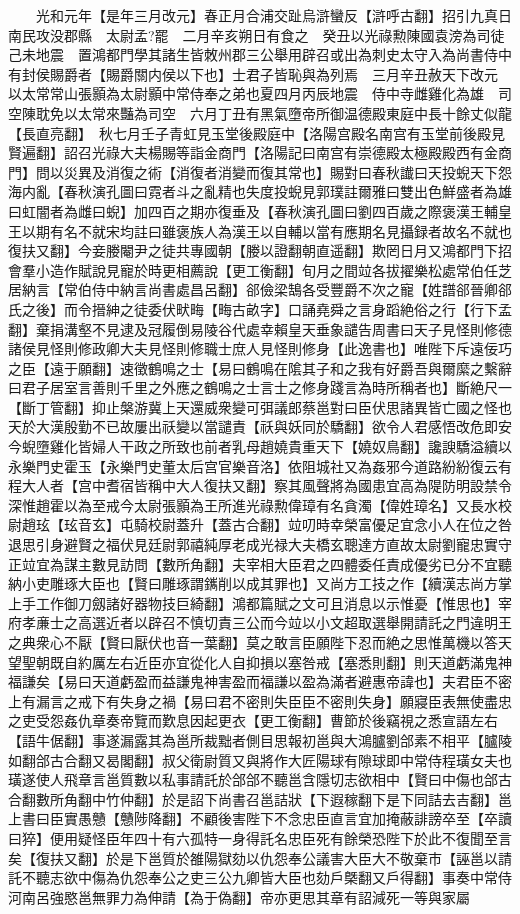 　　光和元年【是年三月改元】春正月合浦交趾烏滸蠻反【滸呼古翻】招引九真日南民攻没郡縣　太尉孟?罷　二月辛亥朔日有食之　癸丑以光祿勲陳國袁滂為司徒　己未地震　置鴻都門學其諸生皆敇州郡三公舉用辟召或出為刺史太守入為尚書侍中有封侯賜爵者【賜爵關内侯以下也】士君子皆恥與為列焉　三月辛丑赦天下改元　以太常常山張顥為太尉顥中常侍奉之弟也夏四月丙辰地震　侍中寺雌雞化為雄　司空陳耽免以太常來豔為司空　六月丁丑有黑氣墮帝所御温德殿東庭中長十餘丈似龍【長直亮翻】　秋七月壬子青虹見玉堂後殿庭中【洛陽宫殿名南宫有玉堂前後殿見賢遍翻】詔召光祿大夫楊賜等詣金商門【洛陽記曰南宫有崇德殿太極殿殿西有金商門】問以災異及消復之術【消復者消變而復其常也】賜對曰春秋䜟曰天投蜺天下怨海内亂【春秋演孔圖曰霓者斗之亂精也失度投蜺見郭璞註爾雅曰雙出色鮮盛者為雄曰虹闇者為雌曰蜺】加四百之期亦復垂及【春秋演孔圖曰劉四百歲之際褒漢王輔皇王以期有名不就宋均註曰雖褒族人為漢王以自輔以當有應期名見攝録者故名不就也復扶又翻】今妾媵閹尹之徒共專國朝【媵以證翻朝直遥翻】欺罔日月又鴻都門下招會羣小造作賦說見寵於時更相薦說【更工衡翻】旬月之間竝各拔擢樂松處常伯任芝居納言【常伯侍中納言尚書處昌呂翻】郤儉梁鵠各受豐爵不次之寵【姓譜郤晉卿郤氏之後】而令搢紳之徒委伏畎畮【畮古畝字】口誦堯舜之言身蹈絶俗之行【行下孟翻】棄捐溝壑不見逮及冠履倒易陵谷代處幸賴皇天垂象譴告周書曰天子見怪則修德諸侯見怪則修政卿大夫見怪則修職士庶人見怪則修身【此逸書也】唯陛下斥遠佞巧之臣【遠于願翻】速徵鶴鳴之士【易曰鶴鳴在隂其子和之我有好爵吾與爾縻之繫辭曰君子居室言善則千里之外應之鶴鳴之士言士之修身踐言為時所稱者也】斷絶尺一【斷丁管翻】抑止槃游冀上天還威衆變可弭議郎蔡邕對曰臣伏思諸異皆亡國之怪也天於大漢殷勤不已故屢出祅變以當譴責【祅與妖同於驕翻】欲令人君感悟改危即安今蜺墮雞化皆婦人干政之所致也前者乳母趙嬈貴重天下【嬈奴鳥翻】讒諛驕溢續以永樂門史霍玉【永樂門史董太后宫官樂音洛】依阻城社又為姦邪今道路紛紛復云有程大人者【宫中耆宿皆稱中大人復扶又翻】察其風聲將為國患宜高為隄防明設禁令深惟趙霍以為至戒今太尉張顥為王所進光祿勲偉璋有名貪濁【偉姓璋名】又長水校尉趙玹【玹音玄】屯騎校尉蓋升【蓋古合翻】竝叨時幸榮富優足宜念小人在位之咎退思引身避賢之福伏見廷尉郭禧純厚老成光禄大夫橋玄聰達方直故太尉劉寵忠實守正竝宜為謀主數見訪問【數所角翻】夫宰相大臣君之四體委任責成優劣已分不宜聽納小吏雕琢大臣也【賢曰雕琢謂䥴削以成其罪也】又尚方工技之作【續漢志尚方掌上手工作御刀劔諸好器物技巨綺翻】鴻都篇賦之文可且消息以示惟憂【惟思也】宰府孝亷士之高選近者以辟召不慎切責三公而今竝以小文超取選舉開請託之門違明王之典衆心不厭【賢曰厭伏也音一葉翻】莫之敢言臣願陛下忍而絶之思惟萬機以答天望聖朝既自約厲左右近臣亦宜從化人自抑損以塞咎戒【塞悉則翻】則天道虧滿鬼神福謙矣【易曰天道虧盈而益謙鬼神害盈而福謙以盈為滿者避惠帝諱也】夫君臣不密上有漏言之戒下有失身之禍【易曰君不密則失臣臣不密則失身】願寢臣表無使盡忠之吏受怨姦仇章奏帝覽而歎息因起更衣【更工衡翻】曹節於後竊視之悉宣語左右【語牛倨翻】事遂漏露其為邕所裁黜者側目思報初邕與大鴻臚劉郃素不相平【臚陵如翻郃古合翻又曷閣翻】叔父衛尉質又與將作大匠陽球有隙球即中常侍程璜女夫也璜遂使人飛章言邕質數以私事請託於郃郃不聽邕含隱切志欲相中【賢曰中傷也郃古合翻數所角翻中竹仲翻】於是詔下尚書召邕詰狀【下遐稼翻下是下同詰去吉翻】邕上書曰臣實愚戇【戇陟降翻】不顧後害陛下不念忠臣直言宜加掩蔽誹謗卒至【卒讀曰猝】便用疑怪臣年四十有六孤特一身得託名忠臣死有餘榮恐陛下於此不復聞至言矣【復扶又翻】於是下邕質於雒陽獄劾以仇怨奉公議害大臣大不敬棄市【誣邕以請託不聽志欲中傷為仇怨奉公之吏三公九卿皆大臣也劾戶槩翻又戶得翻】事奏中常侍河南呂強愍邕無罪力為伸請【為于偽翻】帝亦更思其章有詔減死一等與家屬